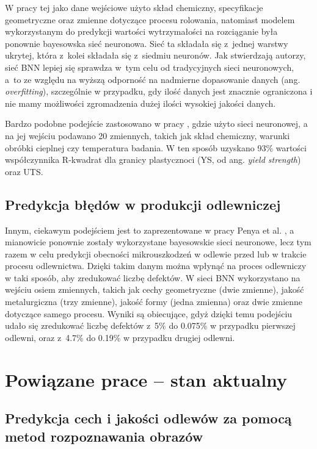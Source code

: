 \noindent W pracy tej jako dane wejściowe użyto skład chemiczny, specyfikacje geometryczne oraz zmienne dotyczące procesu rolowania, natomiast modelem wykorzystanym do predykcji wartości wytrzymałości na rozciąganie była ponownie bayesowska sieć neuronowa. Sieć ta składała się z~jednej warstwy ukrytej, która z~kolei składała się z~siedmiu neuronów. Jak stwierdzają autorzy, sieć BNN lepiej się sprawdza w~tym celu od tradycyjnych sieci neuronowych, a~to ze względu na wyższą odporność na nadmierne dopasowanie danych (ang. \textit{overfitting}), szczególnie w przypadku, gdy ilość danych jest znacznie ograniczona i nie mamy możliwości zgromadzenia dużej ilości wysokiej jakości danych.
    
Bardzo podobne podejście zastosowano w pracy \cite{Wang20}, gdzie użyto sieci neuronowej, a na jej wejściu podawano 20 zmiennych, takich jak skład chemiczny, warunki obróbki cieplnej czy temperatura badania. W ten sposób uzyskano 93\% wartości współczynnika R-kwadrat dla granicy plastycznoci (YS, od ang. \textit{yield strength}) oraz UTS.

\subsection{Predykcja błędów w produkcji odlewniczej}
\label{sub:predykcja.2}

Innym, ciekawym podejściem jest to zaprezentowane w pracy Penya et al. \cite{Yoseba08}, a mianowicie ponownie zostały wykorzystane bayesowskie sieci neuronowe, lecz tym razem w celu predykcji obecności mikrouszkodzeń w odlewie przed lub w trakcie procesu odlewnictwa. Dzięki takim danym można wpłynąć na proces odlewniczy w taki sposób, aby zredukować liczbę defektów. W sieci BNN wykorzystano na wejściu osiem zmiennych, takich jak cechy geometryczne (dwie zmienne), jakość metalurgiczna (trzy zmienne), jakość formy (jedna zmienna) oraz dwie zmienne dotyczące samego procesu. Wyniki są obiecujące, gdyż dzięki temu podejściu udało się zredukować liczbę defektów z~5\% do 0.075\% w przypadku pierwszej odlewni, oraz z~4.7\% do 0.19\% w przypadku drugiej odlewni.

\section{Powiązane prace – stan aktualny}
\label{sec:stan.aktualny}

\subsection{Predykcja cech i jakości odlewów za pomocą metod rozpoznawania obrazów}
\label{sub:predykcja.3}

